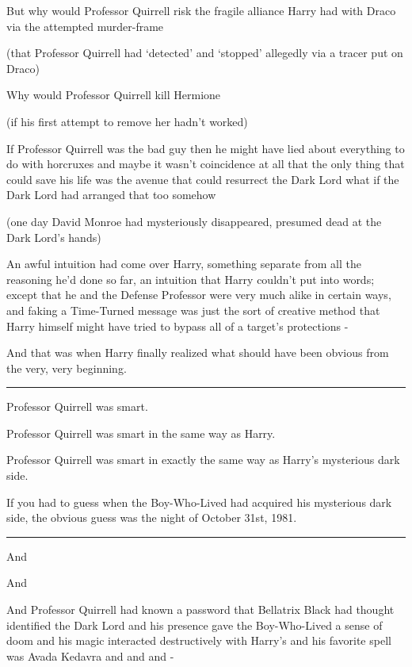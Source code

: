But why would Professor Quirrell risk the fragile alliance Harry had with Draco via the attempted murder-frame

(that Professor Quirrell had `detected' and `stopped' allegedly via a tracer put on Draco)

Why would Professor Quirrell kill Hermione

(if his first attempt to remove her hadn't worked)

If Professor Quirrell was the bad guy then he might have lied about everything to do with horcruxes and maybe it wasn't coincidence at all that the only thing that could save his life was the avenue that could resurrect the Dark Lord what if the Dark Lord had arranged that too somehow

(one day David Monroe had mysteriously disappeared, presumed dead at the Dark Lord's hands)

An awful intuition had come over Harry, something separate from all the reasoning he'd done so far, an intuition that Harry couldn't put into words; except that he and the Defense Professor were very much alike in certain ways, and faking a Time-Turned message was just the sort of creative method that Harry himself might have tried to bypass all of a target's protections -

And that was when Harry finally realized what should have been obvious from the very, very beginning.

\begin{center}\rule{3in}{0.4pt}\end{center}

Professor Quirrell was smart.

Professor Quirrell was smart in the same way as Harry.

Professor Quirrell was smart in exactly the same way as Harry's mysterious dark side.

If you had to guess when the Boy-Who-Lived had acquired his mysterious dark side, the obvious guess was the night of October 31st, 1981.

\begin{center}\rule{3in}{0.4pt}\end{center}

And

And

And Professor Quirrell had known a password that Bellatrix Black had thought identified the Dark Lord and his presence gave the Boy-Who-Lived a sense of doom and his magic interacted destructively with Harry's and his favorite spell was Avada Kedavra and and and -


